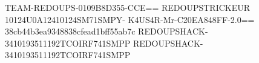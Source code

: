 TEAM-REDOUPS-0109B8D355-CCE==
REDOUPSTRICKEUR 10124U0A12410124SM71SMPY-
K4US4R-Mr-C20EA848FF-2.0==
38cb44b3ea9348838cfead1bff55ab7c
REDOUPSHACK-3410193511192TCOIRF741SMPP
REDOUPSHACK-3410193511192TCOIRF741SMPP
